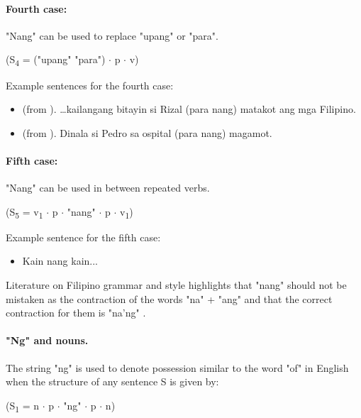 \paragraph{Fourth case:} "Nang" can be used to replace "upang" or "para".
\begin{center}
    (S\textsubscript{4} = ("upang" {\textpipe} "para") \(\cdot\) p \(\cdot\) v)
\end{center}

\begin{example}
    Example sentences for the fourth case:
\end{example}
\begin{itemize}
    \item (from \cite{OOP}). …kailangang bitayin si Rizal (para {\textpipe} nang)
          matakot ang mga Filipino.
    \item (from \cite{OOP}). Dinala si Pedro sa ospital (para {\textpipe} nang)
          magamot.
\end{itemize}

\paragraph{Fifth case:} "Nang" can be used in between repeated verbs.
\begin{center}
    (S\textsubscript{5} = v\textsubscript{1} \(\cdot\) p \(\cdot\) "nang"
    \(\cdot\) p \(\cdot\) v\textsubscript{1})
\end{center}

\begin{example}
    Example sentence for the fifth case:
\end{example}
\begin{itemize}
    \item Kain nang kain...
\end{itemize}

Literature on Filipino grammar and style highlights that "nang" should not be
mistaken as the contraction of the words "na" + "ang" and that the correct
contraction for them is "na'ng" \cite{OOP}.

\paragraph{"Ng" and nouns.} The string "ng" is used to denote possession similar to
the word "of" in English when the structure of any sentence S is given by:

\begin{center}
    (S\textsubscript{1} = n \(\cdot\) p \(\cdot\) "ng" \(\cdot\) p \(\cdot\) n)
\end{center}

